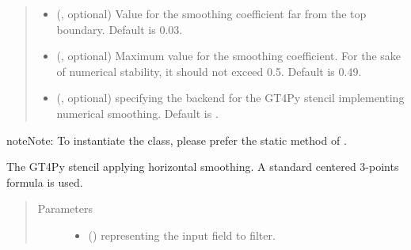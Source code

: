 \documentclass[letterpaper,10pt,english]{sphinxmanual}
\begin{document}
\begin{fulllineitems}
\begin{fulllineitems}
\begin{quote}
\begin{description}
\begin{itemize}
\item {} 
 (, optional) \textendash{} Value for the smoothing coefficient far from the top boundary. Default is 0.03.

\item {} 
 (, optional) \textendash{} Maximum value for the smoothing coefficient. For the sake of numerical stability, it should not
exceed 0.5. Default is 0.49.

\item {} 
 (, optional) \textendash{}  specifying the backend for the GT4Py stencil implementing numerical
smoothing. Default is .

\end{itemize}

\end{description}\end{quote}

\begin{sphinxadmonition}{note}{Note:}
To instantiate the class, please prefer the static method
{\hyperref[\detokenize{api:tasmania.dycore.horizontal_smoothing.HorizontalSmoothing.factory}]{}}
of {\hyperref[\detokenize{api:tasmania.dycore.horizontal_smoothing.HorizontalSmoothing}]{}}.
\end{sphinxadmonition}

\end{fulllineitems}


\begin{fulllineitems}
\label{\detokenize{api:tasmania.dycore.horizontal_smoothing.HorizontalSmoothingFirstOrderXZ._stencil_defs}}
The GT4Py stencil applying horizontal smoothing. A standard centered 3-points formula is used.
\begin{quote}\begin{description}
\item[{Parameters}] \leavevmode\begin{itemize}
\item {} 
 () \textendash{}  representing the input field to filter.


\end{itemize}
\end{description}
\end{quote}
\end{fulllineitems}
\end{fulllineitems}
\end{document}
